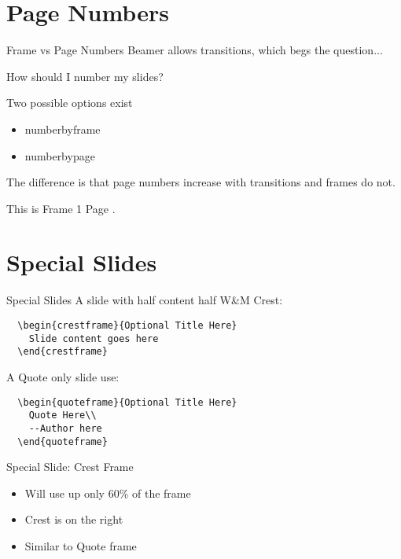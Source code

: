 \documentclass[xcolor=table,compress,professionalfonts,pdfpagelabels]{beamer}
\begin{document}
\section{Page Numbers}
\begin{frame}[fragile]{Frame vs Page Numbers}
Beamer allows transitions, which begs the question...\\
\begin{block}{}
\begin{center}How should I number my slides?\end{center}
\end{block}
Two possible options exist
\begin{itemize}
  \item numberbyframe
  \item numberbypage 
\end{itemize}
The difference is that page numbers \alert{increase} with transitions and frames do not.
\begin{example}
\begin{center}
This is Frame \alert{1} Page \alert{}.
\end{center}
\end{example}
\end{frame}

\section{Special Slides}
\begin{frame}[fragile]{Special Slides}
 A slide with half content half W\&M Crest:
  \begin{verbatim}
  \begin{crestframe}{Optional Title Here}
    Slide content goes here
  \end{crestframe}
  \end{verbatim}
 
  A Quote only slide use:
  \begin{verbatim}
  \begin{quoteframe}{Optional Title Here}
    Quote Here\\
    --Author here
  \end{quoteframe}
  \end{verbatim}
\end{frame}

\begin{crestframe}{Special Slide: Crest Frame}
\begin{itemize}
\item Will use up only 60\% of the frame
\item Crest is on the right
\item Similar to Quote frame
\end{itemize}
\end{crestframe}
\end{document}
